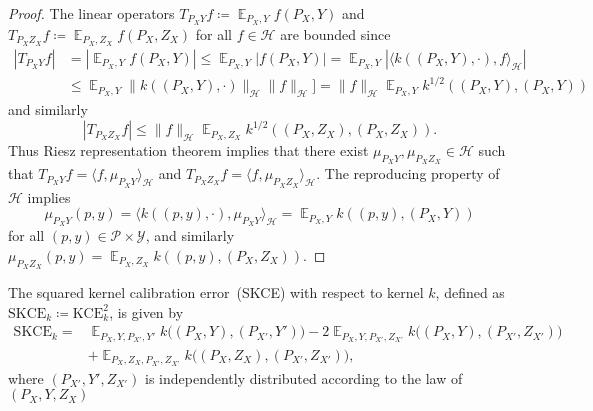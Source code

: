 \documentclass{article}
\DeclareMathOperator{\Exp}{\mathbb{E}}
\begin{document}
\begin{proof}
The linear operators $T_{P_X Y} f \coloneqq \Exp_{P_X, Y} f(P_X, Y)$
and $T_{P_X Z_X} f \coloneqq \Exp_{P_X, Z_X} f(P_X, Z_X)$
for all $f \in \mathcal{H}$ are bounded since
\begin{equation*}
    \begin{split}
        |T_{P_X Y} f| &= |\Exp_{P_X,Y} f(P_X, Y) | \leq \Exp_{P_X,Y} |f(P_X, Y)| = \Exp_{P_X,Y} |\langle k((P_X, Y), \cdot), f\rangle_{\mathcal{H}}| \\
        &\leq \Exp_{P_X,Y} \| k((P_X, Y), \cdot) \|_{\mathcal{H}} \|f\|_{\mathcal{H}}] = \|f\|_{\mathcal{H}} \Exp_{P_X,Y} k^{1/2}((P_X, Y), (P_X, Y))
    \end{split}
\end{equation*}
and similarly
\begin{equation*}
     |T_{P_X Z_X} f| \leq \|f\|_{\mathcal{H}} \Exp_{P_X,Z_X} k^{1/2}((P_X, Z_X), (P_X, Z_X)).
\end{equation*}
Thus Riesz representation theorem implies that there exist
$\mu_{P_X Y}, \mu_{P_X Z_X} \in \mathcal{H}$ such that
$T_{P_X Y} f = \langle f,  \mu_{P_X Y} \rangle_{\mathcal{H}}$ and
$T_{P_X Z_X} f = \langle f,  \mu_{P_X Z_X} \rangle_{\mathcal{H}}$. The reproducing
property of $\mathcal{H}$ implies
\begin{equation*}
    \mu_{P_X Y}(p, y) = \langle k((p, y), \cdot), \mu_{P_X Y} \rangle_{\mathcal{H}} = \Exp_{P_X,Y} k((p, y), (P_X, Y))
\end{equation*}
for all $(p, y) \in \mathcal{P} \times \mathcal{Y}$, and similarly
$ \mu_{P_X Z_X}(p, y) = \Exp_{P_X,Z_X} k((p, y), (P_X, Z_X))$.
\end{proof}

\begin{lemma}\label{lemma:skce}
The squared kernel calibration error~(SKCE) with respect to kernel $k$, defined
as $\mathrm{SKCE}_k \coloneqq \mathrm{KCE}_k^2$, is given by
\begin{equation*}
    \begin{split}
        \mathrm{SKCE}_k ={}& \Exp_{P_X,Y,P_{X'},Y'} k\big((P_X, Y), (P_{X'}, Y')\big)
        - 2 \Exp_{P_X,Y,P_{X'},Z_{X'}} k\big((P_X,Y),(P_{X'},Z_{X'})\big) \\
        &+ \Exp_{P_X,Z_X,P_{X'},Z_{X'}} k\big((P_X, Z_X), (P_{X'}, Z_{X'})\big),
    \end{split}
\end{equation*}
where $(P_{X'}, Y', Z_{X'})$ is independently distributed according to the law
of $(P_X, Y, Z_X)$
\end{lemma}
\end{document}

